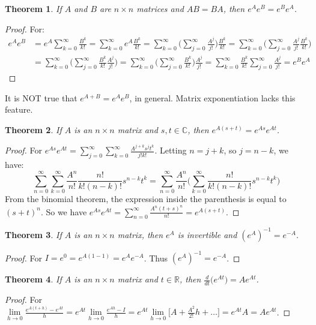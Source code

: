 \documentclass[oneside]{book}
\theoremstyle{mystyle}
\newtheorem{theorem}{Theorem}[section]
\begin{document}
\begin{theorem}
If $A$ and $B$ are $n\times n$ matrices and $AB = BA$, then $e^{A}e^{B} = e^{B}e^{A}$.
\end{theorem}
\begin{proof}
For:
\begin{align*}
    e^A e^B &= e^A\sum_{k=0}^{\infty}\frac{B^k}{k!}=\sum_{k=0}^{\infty} e^A\frac{B^k}{k!}= \sum_{k=0}^{\infty} \big(\sum_{j=0}^{\infty} \frac{A^j}{j!}\big) \frac{B^k}{k!}= \sum_{k=0}^{\infty}\big(\sum_{j=0}^{\infty} \frac{A^j}{j!}\frac{B^k}{k!}\big)\\
    &=\sum_{k=0}^{\infty}\big(\sum_{j=0}^{\infty} \frac{B^k}{k!}\frac{A^j}{j!}\big)=\sum_{k=0}^{\infty}\big(\sum_{j=0}^{\infty} \frac{B^k}{k!}\big)\frac{A^j}{j!}= \sum_{k=0}^{\infty}\frac{B^k}{k!}\sum_{j=0}^{\infty}\frac{A^j}{j!}=e^{B}e^{A}
\end{align*}
\end{proof}
It is NOT true that $e^{A+B}=e^{A}e^{B}$, in general. Matrix exponentiation lacks this feature.
\begin{theorem}
If $A$ is an $n\times n$ matrix and $s,t\in \mathbb{C}$, then $e^{A(s+t)} = e^{As}e^{At}$.
\end{theorem}
\begin{proof}
For $e^{As}e^{At} = \sum_{j=0}^{\infty} \sum_{k=0}^{\infty} \frac{A^{j+k}s^jt^k}{j!k!}$. Letting $n = j+k$, so $j = n-k$, we have:
\begin{equation*}
    \sum_{n=0}^{\infty} \sum_{k=0}^{\infty} \frac{A^n}{n!}\frac{n!}{k!(n-k)!}s^{n-k}t^k = \sum_{n=0}^{\infty}\frac{A^n}{n!}\big(\sum_{k=0}^{\infty} \frac{n!}{k!(n-k)!}s^{n-k}t^k\big)    
\end{equation*}
From the binomial theorem, the expression inside the parenthesis is equal to $(s+t)^n$. So we have $e^{As}e^{At}=\sum_{n=0}^{\infty} \frac{A^n(t+s)^n}{n!} = e^{A(s+t)}$.
\end{proof}
\begin{theorem}
If $A$ is an $n\times n$ matrix, then $e^A$ is invertible and $(e^A)^{-1} = e^{-A}$.
\end{theorem}
\begin{proof}
For $I = e^{0} = e^{A(1-1)} = e^Ae^{-A}$. Thus $(e^{A})^{-1} = e^{-A}$.
\end{proof}
\begin{theorem}
If $A$ is an $n\times n$ matrix and $t\in \mathbb{R}$, then $\frac{d}{dt}\big(e^{At}\big) = Ae^{At}$.
\end{theorem}
\begin{proof}
For $\underset{h\rightarrow 0}\lim \frac{e^{A(t+h)}-e^{At}}{h} = e^{At}\underset{h\rightarrow 0}\lim \frac{e^{Ah}-I}{h} = e^{At}\underset{h\rightarrow 0}\lim\big[A+\frac{A^2}{2!}h+\hdots\big] = e^{At}A = Ae^{At}$.
\end{proof}
\end{document}

